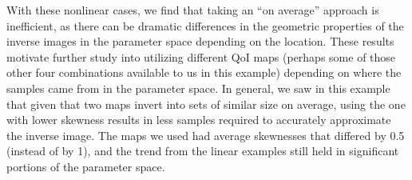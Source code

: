 With these nonlinear cases, we find that taking an ``on average'' approach is inefficient, as there can be dramatic differences in the geometric properties of the inverse images in the parameter space depending on the location.
These results motivate further study into utilizing different QoI maps (perhaps some of those other four combinations available to us in this example) depending on where the samples came from in the parameter space.
In general, we saw in this example that given that two maps invert into sets of similar size on average, using the one with lower skewness results in less samples required to accurately approximate the inverse image.
The maps we used had average skewnesses that differed by 0.5 (instead of by 1), and the trend from the linear examples still held in significant portions of the parameter space.

